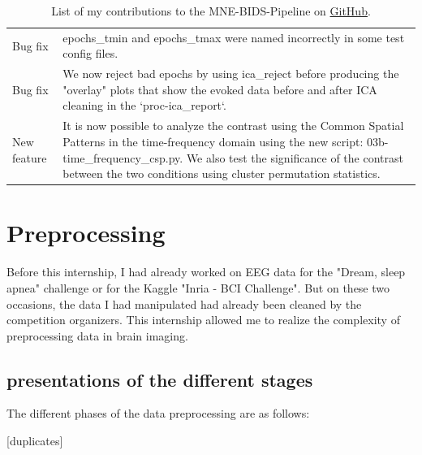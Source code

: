 \begin{table}[ht]
\begin{tabular}{@{}| p{3cm}|p{9cm}| @{}}
        Bug fix          & epochs\_tmin and epochs\_tmax were named incorrectly in some test config files.                                                                                                                                                                                             \\
        Bug fix          & We now reject bad epochs by using ica\_reject before producing the "overlay" plots that show the evoked data before and after ICA cleaning in the `proc-ica\_report`.                                                                                                       \\
        New feature      & It is now possible to analyze the contrast using the Common Spatial Patterns in the time-frequency domain using the new script: 03b-time\_frequency\_csp.py. We also test the significance of the contrast between the two conditions using cluster permutation statistics. \\
        \hline
    \end{tabular}

    \caption[List of my contributions to the MNE-BIDS-Pipeline.]%
    {List of my contributions to the MNE-BIDS-Pipeline on \href{https://raw.githubusercontent.com/mne-tools/MNE-BIDS-Pipeline/main/docs/source/changes.md}{GitHub}.}
    \label{Tab:PR}
\end{table}

\section{Preprocessing}

Before this internship, I had already worked on EEG data for the "Dream, sleep apnea" challenge or for the Kaggle "Inria - BCI Challenge". But on these two occasions, the data I had manipulated had already been cleaned by the competition organizers. This internship allowed me to realize the complexity of preprocessing data in brain imaging.

\subsection{presentations of the different stages}

The different phases of the data preprocessing are as follows:

[duplicates]

